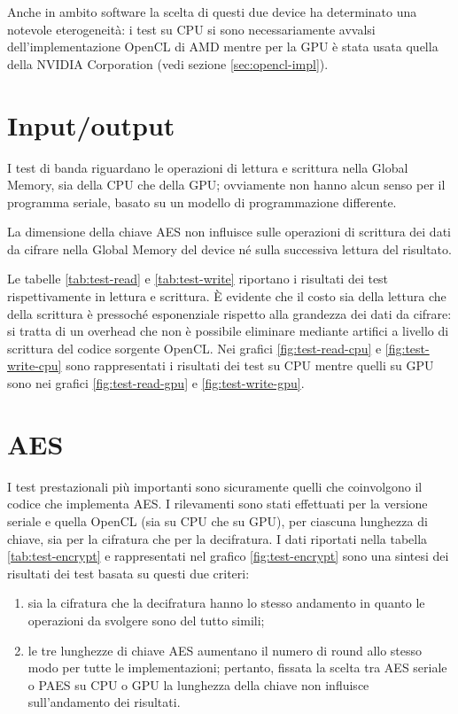 \documentclass[12pt,a4paper,oneside]{book}
\begin{document}
Anche in ambito software la scelta di questi due device ha determinato una notevole eterogeneità: i test su \ac{CPU} si sono necessariamente avvalsi dell'implementazione \ac{OpenCL} di AMD mentre per la \ac{GPU} è stata usata quella della NVIDIA Corporation (vedi sezione \ref{sec:opencl-impl}).

\section{Input/output}

I test di banda riguardano le operazioni di lettura e scrittura nella Global Memory, sia della \ac{CPU} che della \ac{GPU}; ovviamente non hanno alcun senso per il programma seriale, basato su un modello di programmazione differente.

La dimensione della chiave \ac{AES} non influisce sulle operazioni di scrittura dei dati da cifrare nella Global Memory del device né sulla successiva lettura del risultato.

Le tabelle \ref{tab:test-read} e \ref{tab:test-write} riportano i risultati dei test rispettivamente in lettura e scrittura. È evidente che il costo sia della lettura che della scrittura è pressoché esponenziale rispetto alla grandezza dei dati da cifrare: si tratta di un overhead che non è possibile eliminare mediante artifici a livello di scrittura del codice sorgente \ac{OpenCL}. Nei grafici \ref{fig:test-read-cpu} e \ref{fig:test-write-cpu} sono rappresentati i risultati dei test su \ac{CPU} mentre quelli su \ac{GPU} sono nei grafici \ref{fig:test-read-gpu} e \ref{fig:test-write-gpu}.

\section{AES}

I test prestazionali più importanti sono sicuramente quelli che coinvolgono il codice che implementa \ac{AES}. I rilevamenti sono stati effettuati per la versione seriale e quella \ac{OpenCL} (sia su \ac{CPU} che su \ac{GPU}), per ciascuna lunghezza di chiave, sia per la cifratura che per la decifratura. I dati riportati nella tabella \ref{tab:test-encrypt} e rappresentati nel grafico \ref{fig:test-encrypt} sono una sintesi dei risultati dei test basata su questi due criteri:
\begin{enumerate}
\item sia la cifratura che la decifratura hanno lo stesso andamento in quanto le operazioni da svolgere sono del tutto simili;
\item le tre lunghezze di chiave \ac{AES} aumentano il numero di round allo stesso modo per tutte le implementazioni; pertanto, fissata la scelta tra \ac{AES} seriale o PAES su \ac{CPU} o \ac{GPU} la lunghezza della chiave non influisce sull'andamento dei risultati.
\end{enumerate}
\end{document}
